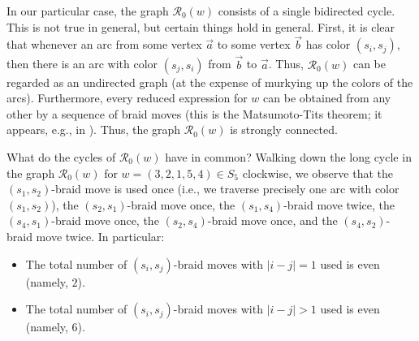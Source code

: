 \documentclass
[numbers=enddot,12pt,final,onecolumn,notitlepage,abstracton]{scrartcl}%
\theoremstyle{definition}
\begin{document}
In our particular case, the graph $\mathcal{R}_{0}\left(  w\right)  $ consists
of a single bidirected cycle. This is not true in general, but certain things
hold in general. First, it is clear that whenever an arc from some vertex
$\overrightarrow{a}$ to some vertex $\overrightarrow{b}$ has color $\left(
s_{i},s_{j}\right)  $, then there is an arc with color $\left(  s_{j}%
,s_{i}\right)  $ from $\overrightarrow{b}$ to $\overrightarrow{a}$. Thus,
$\mathcal{R}_{0}\left(  w\right)  $ can be regarded as an undirected graph (at
the expense of murkying up the colors of the arcs). Furthermore, every reduced
expression for $w$ can be obtained from any other by a sequence of braid moves
(this is the Matsumoto-Tits theorem; it appears, e.g., in \cite[Theorem
1.9]{Lusztig-Hecke}). Thus, the graph $\mathcal{R}_{0}\left(  w\right)  $ is
strongly connected.

What do the cycles of $\mathcal{R}_{0}\left(  w\right)  $ have in common?
Walking down the long cycle in the graph $\mathcal{R}_{0}\left(  w\right)  $
for $w=\left(  3,2,1,5,4\right)  \in S_{5}$ clockwise, we observe that the
$\left(  s_{1},s_{2}\right)  $-braid move is used once (i.e., we traverse
precisely one arc with color $\left(  s_{1},s_{2}\right)  $), the $\left(
s_{2},s_{1}\right)  $-braid move once, the $\left(  s_{1},s_{4}\right)
$-braid move twice, the $\left(  s_{4},s_{1}\right)  $-braid move once, the
$\left(  s_{2},s_{4}\right)  $-braid move once, and the $\left(  s_{4}%
,s_{2}\right)  $-braid move twice. In particular:

\begin{itemize}
\item The total number of $\left(  s_{i},s_{j}\right)  $-braid moves with
$\left\vert i-j\right\vert =1$ used is even (namely, $2$).

\item The total number of $\left(  s_{i},s_{j}\right)  $-braid moves with
$\left\vert i-j\right\vert >1$ used is even (namely, $6$).
\end{itemize}
\end{document}
